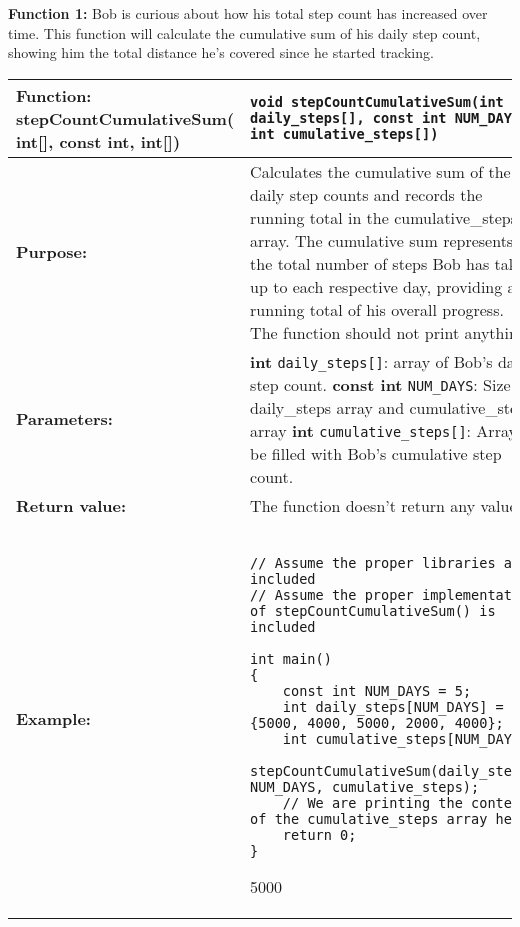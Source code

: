 \newline
\textbf{Function 1:} Bob is curious about how his total step count has increased over time. This function will calculate the cumulative sum of his daily step count, showing him the total distance he's covered since he started tracking.
\begin{longtable}[H]{|p{1.7in}|p{4.0in}|} \hline
        \textbf{Function:} \newline 
        stepCountCumulativeSum( int[], const int, int[]) & \texttt{void stepCountCumulativeSum(int daily_steps[], const int NUM_DAYS, int cumulative_steps[])}
        \\ \hline
        \textbf{Purpose:}  & Calculates the cumulative sum of the daily step counts and records the running total in the cumulative\_steps array. The cumulative sum represents the total number of steps Bob has taken up to each respective day, providing a running total of his overall progress. The function should not print anything.\\ \hline
        \textbf{Parameters:} &  
        \textbf{int} \texttt{daily\_steps[]}: array of Bob's daily step count. \newline
        \textbf{const int} \texttt{NUM\_DAYS}: Size of daily\_steps array and cumulative\_steps array\newline
        \textbf{int} \texttt{cumulative\_steps[]}: Array to be filled with Bob's cumulative step count.
\\ \hline
        \textbf{Return value:} &  The function doesn't return any value. \newline 
        \\ \hline
        \textbf{Example:} & 
        \begin{example}
        \begin{verbatim}

// Assume the proper libraries are included
// Assume the proper implementation of stepCountCumulativeSum() is included

int main()
{
    const int NUM_DAYS = 5;
    int daily_steps[NUM_DAYS] = {5000, 4000, 5000, 2000, 4000};
    int cumulative_steps[NUM_DAYS];
    stepCountCumulativeSum(daily_steps, NUM_DAYS, cumulative_steps);
    // We are printing the contents of the cumulative_steps array here.
    return 0;
}
        \end{verbatim}
        \end{example}

        \begin{sample}
5000\newline
9000\newline
14000\newline
16000\newline
20000
        \end{sample}
             \\ \hline
\end{longtable}

